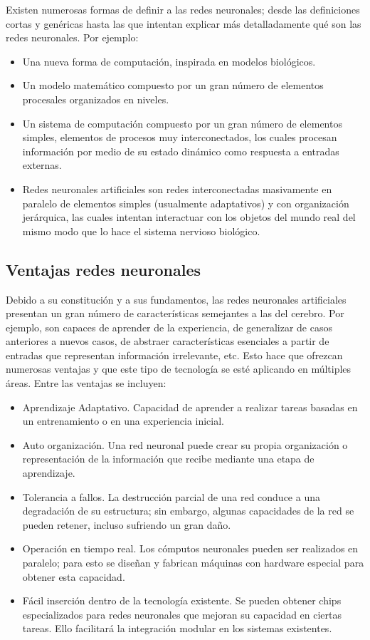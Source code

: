 Existen numerosas formas de definir a las redes neuronales; desde las
definiciones cortas y genéricas hasta las que intentan explicar más detalladamente qué son las redes neuronales. Por ejemplo:
\begin{itemize}
\item Una nueva forma de computación, inspirada en modelos biológicos.
\item Un modelo matemático compuesto por un gran número de elementos
  	procesales organizados en niveles.
\item Un sistema de computación compuesto por un gran número de elementos
simples, elementos de procesos muy interconectados, los cuales procesan información por medio de su estado dinámico como respuesta a entradas externas.
\item Redes neuronales artificiales son redes interconectadas masivamente en
paralelo de elementos simples (usualmente adaptativos) y con organización jerárquica, las cuales intentan interactuar con los objetos del mundo real del mismo modo que lo hace el sistema nervioso biológico.\cite{matich2001redes}
\end{itemize}

\subsection{Ventajas redes neuronales}
Debido a su constitución y a sus fundamentos, las redes neuronales artificiales presentan un gran número de características semejantes a las del cerebro. Por ejemplo, son capaces de aprender de la experiencia, de generalizar de casos anteriores a nuevos casos, de abstraer características esenciales a partir de entradas que representan información irrelevante, etc. Esto hace que ofrezcan numerosas ventajas y que este tipo de tecnología se esté aplicando en múltiples áreas. Entre las ventajas se incluyen:
\begin{itemize}
\item Aprendizaje Adaptativo. Capacidad de aprender a realizar tareas basadas en un entrenamiento o en una experiencia inicial.
\item Auto organización. Una red neuronal puede crear su propia organización o
representación de la información que recibe mediante una etapa de aprendizaje.
\item Tolerancia a fallos. La destrucción parcial de una red conduce a una
degradación de su estructura; sin embargo, algunas capacidades de la red se pueden retener, incluso sufriendo un gran daño.
\item Operación en tiempo real. Los cómputos neuronales pueden ser realizados en paralelo; para esto se diseñan y fabrican máquinas con hardware especial para obtener esta capacidad.
\item Fácil inserción dentro de la tecnología existente. Se pueden obtener chips especializados para redes neuronales que mejoran su capacidad en ciertas tareas. Ello facilitará la integración modular en los sistemas existentes.
\end{itemize}


